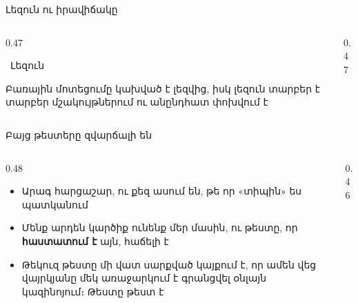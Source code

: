 \begin{frame}{Լեզուն ու իրավիճակը}
  \begin{columns}[T]
    \begin{column}{0.47\textwidth}
      \begin{card}[colback=peach!35!cardwhite]
        \ {\blackfont Լեզուն}\par\smallskip
        Բառային մոտեցումը կախված է լեզվից, իսկ լեզուն տարբեր է տարբեր մշակույթներում ու անընդհատ փոխվում է
      \end{card}
    \end{column}
    \begin{column}{0.47\textwidth}
    \end{column}
  \end{columns}
  \vspace{1mm}
\end{frame}

\begin{frame}{Բայց թեստերը զվարճալի են}
  \begin{columns}[c]
    \begin{column}{0.48\textwidth}
      \begin{itemize}
        \item Արագ հարցաշար, ու քեզ ասում են, թե որ «տիպին» ես պատկանում
        \item<2-> Մենք արդեն կարծիք ունենք մեր մասին, ու թեստը, որ \textbf{հաստատում է} այն, հաճելի է
        \item<3-> Թեկուզ թեստը մի վատ սարքված կայքում է, որ ամեն վեց վայրկյանը մեկ առաջարկում է գրանցվել օնլայն կազինոյում։ Թեստը թեստ է
      \end{itemize}
    \end{column}
    \begin{column}{0.46\textwidth}
    \end{column}
  \end{columns}
\end{frame}

